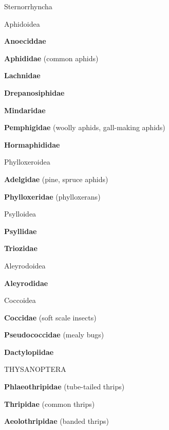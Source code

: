 \documentclass[letterpaper,10pt]{article}
\begin{document}
{\makebox[0.20cm]{}  Sternorrhyncha \par
\makebox[0.40cm]{}  Aphidoidea \par
\makebox[0.6cm]{}  \textbf{Anoeciddae} \par
\makebox[0.6cm]{}  \textbf{Aphididae} (common aphids) \par
\makebox[0.6cm]{}  \textbf{Lachnidae} \par
\makebox[0.6cm]{}  \textbf{Drepanosiphidae} \par
\makebox[0.6cm]{}  \textbf{Mindaridae} \par
\makebox[0.6cm]{}  \textbf{Pemphigidae} (woolly aphids, gall-making aphids) \par
\makebox[0.6cm]{}  \textbf{Hormaphididae} \par
\makebox[0.40cm]{}  Phylloxeroidea \par
\makebox[0.6cm]{}  \textbf{Adelgidae} (pine, spruce aphids) \par
\makebox[0.6cm]{}  \textbf{Phylloxeridae} (phylloxerans) \par
\makebox[0.40cm]{}  Psylloidea \par
\makebox[0.6cm]{}  \textbf{Psyllidae} \par
\makebox[0.6cm]{}  \textbf{Triozidae} \par
\makebox[0.40cm]{}  Aleyrodoidea \par
\makebox[0.6cm]{}  \textbf{Aleyrodidae} \par
\makebox[0.40cm]{}  Coccoidea \par
\makebox[0.6cm]{}  \textbf{Coccidae} (soft scale insects) \par
\makebox[0.6cm]{}  \textbf{Pseudococcidae} (mealy bugs) \par
\makebox[0.6cm]{}  \textbf{Dactylopiidae} \par
%
%
%
\makebox[0.0cm]{}  THYSANOPTERA \par
\makebox[0.6cm]{}  \textbf{Phlaeothripidae} (tube-tailed thrips) \par
\makebox[0.6cm]{}  \textbf{Thripidae} (common thrips) \par
\makebox[0.6cm]{}  \textbf{Aeolothripidae} (banded thrips) \par
}
\end{document}
